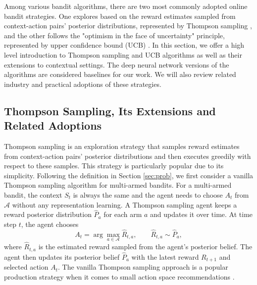 Among various bandit algorithms, there are two most commonly adopted online bandit strategies. One explores based on the reward estimates sampled from context-action pairs' posterior distributions, represented by Thompson sampling \cite{thompson1933likelihood}, and the other follows the "optimism in the face of uncertainty" principle, represented by upper confidence bound (UCB) \cite{agrawal1995sample, auer2002finite}. In this section, we offer a high level introduction to Thompson sampling and UCB algorithms as well as their extensions to contextual settings. The deep neural network versions of the algorithms are considered baselines for our work. We will also review related industry and practical adoptions of these strategies. 

\subsection{Thompson Sampling, Its Extensions and Related Adoptions} \label{sec:ts}
Thompson sampling is an exploration strategy that samples reward estimates from context-action pairs' posterior distributions and then executes greedily with respect to these samples. This strategy is particularly popular due to its simplicity. Following the definition in Section \ref{sec:prob}, we first consider a vanilla Thompson sampling algorithm \cite{thompson1933likelihood} for multi-armed bandits. For a multi-armed bandit, the context $S_t$ is always the same and the agent needs to choose $A_t$ from $\mathcal{A}$ without any representation learning. A Thompson sampling agent keeps a reward posterior distribution $\hat{P}_{a}$ for each arm $a$ and updates it over time. At time step $t$, the agent chooses
\begin{equation}
    A_t = \arg\max_{a \in \mathcal{A}} \hat{R}_{t, a}, \qquad \hat{R}_{t, a} \sim \hat{P}_a,
\end{equation}
where $\hat{R}_{t, a}$ is the estimated reward sampled from the agent's posterior belief. The agent then updates its posterior belief $\hat{P}_{a}$ with the latest reward $R_{t+1}$ and selected action $A_t$. The vanilla Thompson sampling approach is a popular production strategy when it comes to small action space recommendations \cite{sanz2019simple, hsieh2015efficient}. 

